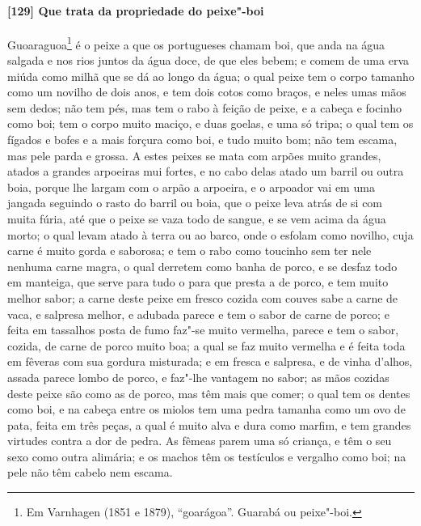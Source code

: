 \paragraph{[129] Que trata da propriedade do peixe"-boi}\quad
Guoaraguoa\footnote{ Em Varnhagen (1851 e 1879), ``goarágoa''. Guarabá ou peixe"-boi.} é o
peixe a que os portugueses chamam boi, que anda na água salgada e nos rios juntos da água
doce, de que eles bebem; e comem de uma erva miúda como milhã que se dá ao longo da água;
o qual peixe tem o corpo tamanho como um novilho de dois anos, e tem dois cotos como
braços, e neles umas mãos sem dedos; não tem pés, mas tem o rabo à feição de peixe, e a
cabeça e focinho como boi; tem o corpo muito maciço, e duas goelas, e uma só tripa; o qual
tem os fígados e bofes e a mais forçura como boi, e tudo muito bom; não tem escama, mas
pele parda e grossa. A estes peixes se mata com arpões muito grandes, atados a grandes
arpoeiras mui fortes, e no cabo delas atado um barril ou outra boia, porque lhe largam com
o arpão a arpoeira, e o arpoador vai em uma jangada seguindo o rasto do barril ou boia,
que o peixe leva atrás de si com muita fúria, até que o peixe se vaza todo de sangue, e se
vem acima da água morto; o qual levam atado à terra ou ao barco, onde o esfolam como
novilho, cuja carne é muito gorda e saborosa; e tem o rabo como toucinho sem ter nele
nenhuma carne magra, o qual derretem como banha de porco, e se desfaz todo em manteiga,
que serve para tudo o para que presta a de porco, e tem muito melhor sabor; a carne deste
peixe em fresco cozida com couves sabe a carne de vaca, e salpresa melhor, e adubada
parece e tem o sabor de carne de porco; e feita em tassalhos posta de fumo faz"-se muito
vermelha, parece e tem o sabor, cozida, de carne de porco muito boa; a qual se faz muito
vermelha e é feita toda em fêveras com sua gordura misturada; e em fresca e salpresa, e de
vinha d'alhos, assada parece lombo de porco, e faz"-lhe vantagem no sabor; as mãos cozidas
deste peixe são como as de porco, mas têm mais que comer; o qual tem os dentes como boi, e
na cabeça entre os miolos tem uma pedra tamanha como um ovo de pata, feita em três peças,
a qual é muito alva e dura como marfim, e tem grandes virtudes contra a dor de pedra. As
fêmeas parem uma só criança, e têm o seu sexo como outra alimária; e os machos têm os
testículos e vergalho como boi; na pele não têm cabelo nem escama.


